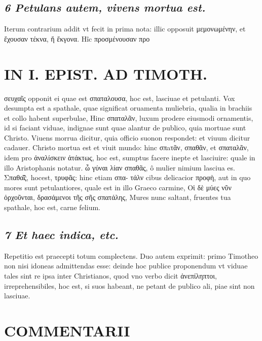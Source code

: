 \documentclass{article}
\begin{document}
\begin{pages}
\subsection*{\textit{6 Petulans autem, vivens mortua est. }}\pstart Iterum contrarium addit vt fecit in prima nota: illic opposuit μεμονωμένην, et ἔχουσαν τέκνα, ἤ ἔκγονα.  Hîc προσμένουσαν προ\pend
\section*{IN I. EPIST. AD TIMOTH. }
\marginpar{[ p.125 ]}\pstart σευχαῖς opponit ei quae est σπαταλουσα, hoc est, lasciuae et petulanti. Vox desumpta est a spathale, quae significat oruamenta muliebria, qualia in brachiis et collo habent superbulae, Hinc σπαταλᾶν, luxum prodere eiusmodi ornamentis, id si faciant viduae, indignae sunt quae alantur de publico, quia mortuae sunt Christo. Viuens morrua dicitur, quia officio suonon respondet: et viuum dicitur cadauer. Christo mortua est et viuit mundo: hinc σπaτᾶν, σπαθᾶν, et σπαταλᾶν, idem pro ἀναλίσκειν ἀτάκτως, hoc est, sumptus facere inepte et lasciuire: quale in illo Aristophanis notatur. ὦ γύναι λίαν σπαθᾶς, ô mulier nimium lasciua es. Σπαθα̃͂ς, hocest, τρυφᾶς: hinc etiam σπα- τάλν cibus delicacior προφὴ, aut in quo mores sunt petulantiores, quale est in illo Graeco carmine, Οἱ δὲ μύες νῦν ὀρχοῦνται, δρασάμενοι τῆς σῆς σπατάλης, Mures nunc saltant, fruentes tua spathale, hoc est, carne felium.  \pend
{}
{}
\subsection*{\textit{7 Et haec indica, etc. }}\pstart Repetitio est praecepti totum complectens. Duo autem exprimit: primo Timotheo non nisi idoneas admittendas esse: deinde hoc publice proponendum vt viduae tales sint re ipsa inter Christianos, quod vno verbo dicit ἀνεπίληπτοι, irreprehensibiles, hoc est, si suos habeant, ne petant de publico ali, piae sint non lasciuae.  \pend
\section*{COMMENTARII }
\marginpar{[ p.126 ]}
{}

\end{pages}
\end{document}

